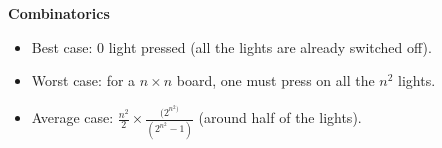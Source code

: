 \documentclass{article}
\begin{document}
  \bigskip
  \textbf{Combinatorics}
  
  \begin{itemize}
    \item Best case: 0 light pressed (all the lights are already switched off).
    \item Worst case: for a $n \times n$ board, one must press on all the $n^2$ lights.
    \item Average case: $\displaystyle{\frac{n^2}{2} \times \frac{(2^{n^2)}}{(2^{n^2} - 1)}}$ (around half of the lights).
  \end{itemize}
\end{document}
